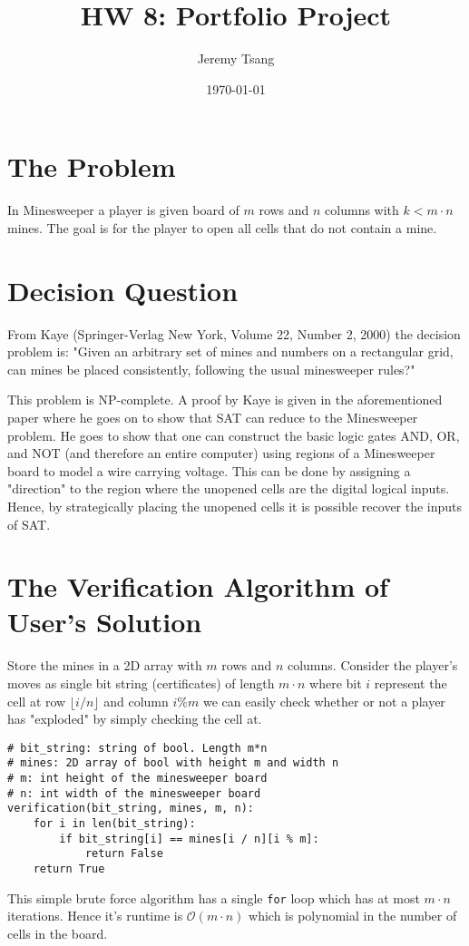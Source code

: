 \documentclass[11pt]{article}
\author{Jeremy Tsang}
\date{\today}
\title{HW 8: Portfolio Project}
\begin{document}
\maketitle
\section*{The Problem}
\label{sec:org957d26f}
In Minesweeper a player is given board of \(m\) rows and \(n\) columns with \(k < m\cdot n\) mines. The goal is for the player to open all cells that do not contain a mine.
\section*{Decision Question}
\label{sec:org7975c47}
From Kaye (Springer-Verlag New York, Volume 22, Number 2, 2000) the decision problem is: "Given an arbitrary set of mines and numbers on a rectangular grid, can mines be placed consistently, following the usual minesweeper rules?"

This problem is NP-complete. A proof by Kaye is given in the aforementioned paper where he goes on to show that SAT can reduce to the Minesweeper problem. He goes to show that one can construct the basic logic gates AND, OR, and NOT (and therefore an entire computer) using regions of a Minesweeper board to model a wire carrying voltage. This can be done by assigning a "direction" to the region where the unopened cells are the digital logical inputs. Hence, by strategically placing the unopened cells it is possible recover the inputs of SAT.
\section*{The Verification Algorithm of User's Solution}
\label{sec:org06cbb56}
Store the mines in a 2D array with \(m\) rows and \(n\) columns. Consider the player's moves as single bit string (certificates) of length \(m \cdot n\) where bit \(i\) represent the cell at row \(\lfloor i / n \rfloor\) and column \(i \% m\) we can easily check whether or not a player has "exploded" by simply checking the cell at.
\begin{verbatim}
# bit_string: string of bool. Length m*n
# mines: 2D array of bool with height m and width n
# m: int height of the minesweeper board
# n: int width of the minesweeper board
verification(bit_string, mines, m, n):
    for i in len(bit_string):
        if bit_string[i] == mines[i / n][i % m]:
            return False
    return True
\end{verbatim}
This simple brute force algorithm has a single \texttt{for} loop which has at most \(m \cdot n\) iterations. Hence it's runtime is \(\mathcal{O}(m \cdot n)\) which is polynomial in the number of cells in the board.
\end{document}
